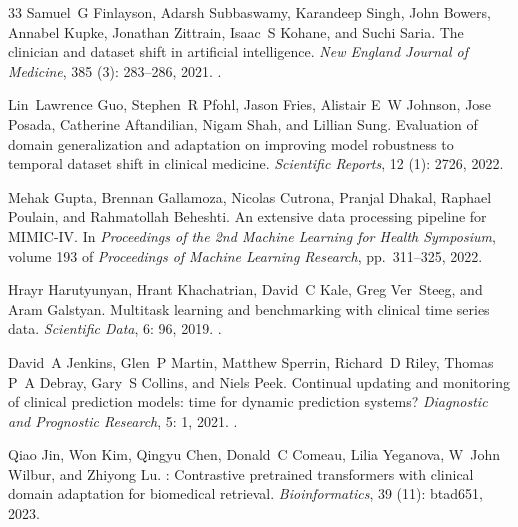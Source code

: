 \documentclass[10pt,a4paper,twocolumn]{article}
\begin{document}
\begin{thebibliography}{33}
		Samuel~G Finlayson, Adarsh Subbaswamy, Karandeep Singh, John Bowers, Annabel
		Kupke, Jonathan Zittrain, Isaac~S Kohane, and Suchi Saria.
		\newblock The clinician and dataset shift in artificial intelligence.
		\newblock \emph{New England Journal of Medicine}, 385 (3):
		283--286, 2021.
		\newblock {}.
		
		Lin~Lawrence Guo, Stephen~R Pfohl, Jason Fries, Alistair E~W Johnson, Jose
		Posada, Catherine Aftandilian, Nigam Shah, and Lillian Sung.
		\newblock Evaluation of domain generalization and adaptation on improving model
		robustness to temporal dataset shift in clinical medicine.
		\newblock \emph{Scientific Reports}, 12 (1): 2726, 2022.
		
		Mehak Gupta, Brennan Gallamoza, Nicolas Cutrona, Pranjal Dhakal, Raphael
		Poulain, and Rahmatollah Beheshti.
		\newblock An extensive data processing pipeline for {MIMIC-IV}.
		\newblock In \emph{Proceedings of the 2nd Machine Learning for Health
			Symposium}, volume 193 of \emph{Proceedings of Machine Learning Research},
		pp.\  311--325, 2022.
		
		Hrayr Harutyunyan, Hrant Khachatrian, David~C Kale, Greg Ver~Steeg, and Aram
		Galstyan.
		\newblock Multitask learning and benchmarking with clinical time series data.
		\newblock \emph{Scientific Data}, 6: 96, 2019.
		\newblock {}.
		
		David~A Jenkins, Glen~P Martin, Matthew Sperrin, Richard~D Riley, Thomas P~A
		Debray, Gary~S Collins, and Niels Peek.
		\newblock Continual updating and monitoring of clinical prediction models: time
		for dynamic prediction systems?
		\newblock \emph{Diagnostic and Prognostic Research}, 5: 1, 2021.
		\newblock {}.
		
		Qiao Jin, Won Kim, Qingyu Chen, Donald~C Comeau, Lilia Yeganova, W~John Wilbur,
		and Zhiyong Lu.
		: Contrastive pretrained transformers with clinical domain
		adaptation for biomedical retrieval.
		\newblock \emph{Bioinformatics}, 39 (11): btad651, 2023.
		

\end{thebibliography}
\end{document}

